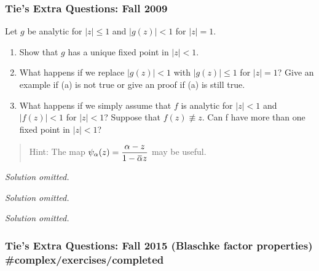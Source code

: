 \hypertarget{ties-extra-questions-fall-2009-3}{%
\subsubsection{Tie's Extra Questions: Fall
2009}\label{ties-extra-questions-fall-2009-3}}

\begin{problem}[?]

Let \(g\) be analytic for \(|z|\leq 1\) and \(|g(z)| < 1\) for
\(|z| = 1\).

\begin{enumerate}
\def\labelenumi{\arabic{enumi}.}
\item
  Show that \(g\) has a unique fixed point in \(|z| < 1\).
\item
  What happens if we replace \(|g(z)| < 1\) with \(|g(z)|\leq 1\) for
  \(|z|=1\)? Give an example if (a) is not true or give an proof if (a)
  is still true.
\item
  What happens if we simply assume that \(f\) is analytic for
  \(|z| < 1\) and \(|f(z)| < 1\) for \(|z| < 1\)? Suppose that
  \(f(z) \not\equiv z\). Can f have more than one fixed point in
  \(|z| < 1\)?
\end{enumerate}

\begin{quote}
Hint: The map
\(\displaystyle{\psi_{\alpha}(z)=\frac{\alpha-z}{1-\mkern 1.5mu\overline{\mkern-1.5mu\alpha\mkern-1.5mu}\mkern 1.5muz}}\)
may be useful.
\end{quote}

\end{problem}

\emph{Solution omitted.}

\emph{Solution omitted.}

\emph{Solution omitted.}

\hypertarget{ties-extra-questions-fall-2015-blaschke-factor-properties-complexexercisescompleted}{%
\subsubsection{Tie's Extra Questions: Fall 2015 (Blaschke factor
properties)
\#complex/exercises/completed}\label{ties-extra-questions-fall-2015-blaschke-factor-properties-complexexercisescompleted}}

